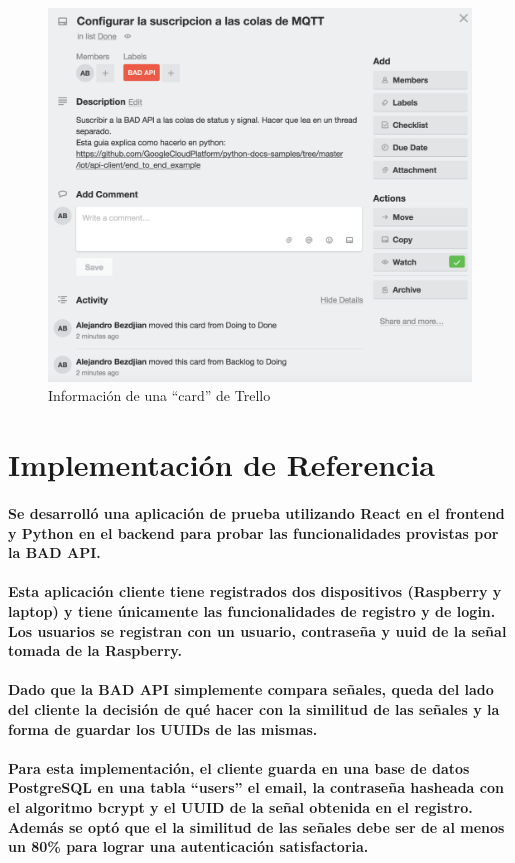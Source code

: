 \documentclass{article}
\begin{document}
\begin{figure}[ht]
    \centering
    \includegraphics[width=5in]{trellocard.png}%
    \caption{Información de una “card” de Trello}
\end{figure}

\section{Implementación de Referencia}
\paragraph{
Se desarrolló una aplicación de prueba utilizando React en el frontend y Python en el backend para probar las funcionalidades provistas por la BAD API.
}
\paragraph{
Esta aplicación cliente tiene registrados dos dispositivos (Raspberry y laptop) y tiene únicamente las funcionalidades de registro y de login. Los usuarios se registran con un usuario, contraseña y uuid de la señal tomada de la Raspberry.
}
\paragraph{
Dado que la BAD API simplemente compara señales, queda del lado del cliente la decisión de qué hacer con la similitud de las señales y la forma de guardar los UUIDs de las mismas.
}
\paragraph{
Para esta implementación, el cliente guarda en una base de datos PostgreSQL en una tabla “users” el email, la contraseña hasheada con el algoritmo bcrypt y el UUID de la señal obtenida en el registro. Además se optó que el la similitud de las señales debe ser de al menos un 80\% para lograr una autenticación satisfactoria.
}
\end{document}
